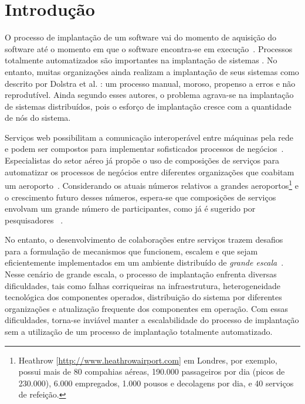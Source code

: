 \chapter{Introdução}
\label{cap:introducao}

O processo de implantação de um software vai do momento de aquisição do software até o momento em que o software encontra-se em execução~\cite{DEPL2006}. Processos totalmente automatizados são importantes na implantação de sistemas \cite{Humble2011Continuous}. No entanto, muitas organizações ainda realizam a implantação de seus sistemas como descrito por Dolstra et al. \cite{Dolstra2005Configuration}: um processo manual, moroso, propenso a erros e não reprodutível. Ainda segundo esses autores, o problema agrava-se na implantação de sistemas distribuídos, pois o esforço de implantação cresce com a quantidade de nós do sistema. 


Serviços web possibilitam a comunicação interoperável entre máquinas pela rede~\cite{W3C2004WS}
e podem ser compostos para implementar sofisticados processos de negócios~\cite{Papazoglou2007State}.
Especialistas do setor aéreo já propõe o uso de composições de serviços
para automatizar os processos de negócios entre diferentes organizações
que coabitam um aeroporto~\cite{Choreos2012D6.2}.
Considerando os atuais números relativos a grandes
aeroportos\footnote{Heathrow [\url{http://www.heathrowairport.com}] em Londres, por exemplo, 
possui mais de 80 compahias aéreas, 190.000 passageiros por dia (picos de 230.000),
6.000 empregados, 1.000 pousos e decolagens por dia, e 40 serviços de refeição.}
e o crescimento futuro desses números, espera-se que
composições de serviços envolvam um grande número de participantes,
como já é sugerido por pesquisadores~\cite{Valerie2011FutureInternet} .

No entanto, o desenvolvimento de colaborações entre serviços 
trazem desafios para a formulação de mecanismos que funcionem, 
escalem e que sejam eficientemente implementados 
em um ambiente distribuído de \emph{grande escala}~\cite{Steen2011VeryLarge}.
Nesse cenário de grande escala,
o processo de implantação enfrenta diversas dificuldades, 
tais como falhas corriqueiras na infraestrutura, 
heterogeneidade tecnológica dos componentes operados, 
distribuição do sistema por diferentes organizações
e atualização frequente dos componentes em operação.
Com essas dificuldades, torna-se inviável manter a escalabilidade do processo de implantação
sem a utilização de um processo de implantação totalmente automatizado.

